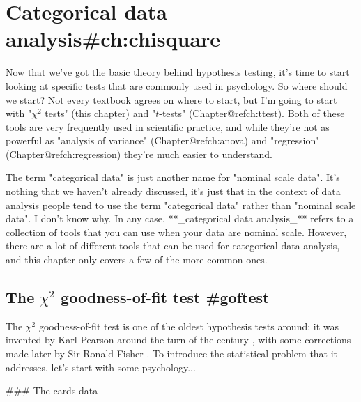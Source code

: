 
\chapter{Categorical data analysis{#ch:chisquare}}


Now that we've got the basic theory behind hypothesis testing, it's time to start looking at specific tests that are commonly used in psychology. So where should we start? Not every textbook agrees on where to start, but I'm going to start with "$\chi^2$ tests" (this chapter) and "$t$-tests" (Chapter@refch:ttest). Both of these tools are very frequently used in scientific practice, and while they're not as powerful as "analysis of variance" (Chapter@refch:anova) and "regression" (Chapter@refch:regression) they're much easier to understand.

The term "categorical data" is just another name for "nominal scale data". It's nothing that we haven't already discussed, it's just that in the context of data analysis people tend to use the term "categorical data" rather than "nominal scale data". I don't know why. In any case, **_categorical data analysis_** refers to a collection of tools that you can use when your data are nominal scale. However, there are a lot of different tools that can be used for categorical data analysis, and this chapter only covers a few of the more common ones.


\section{The $\chi^2$ goodness-of-fit test {#goftest}}

The $\chi^2$ goodness-of-fit test is one of the oldest hypothesis tests around: it was invented by Karl Pearson around the turn of the century \cite{Pearson1900}, with some corrections made later by  Sir Ronald Fisher \cite{Fisher1922}. To introduce the statistical problem that it addresses, let's start with some psychology... 

### The cards data

